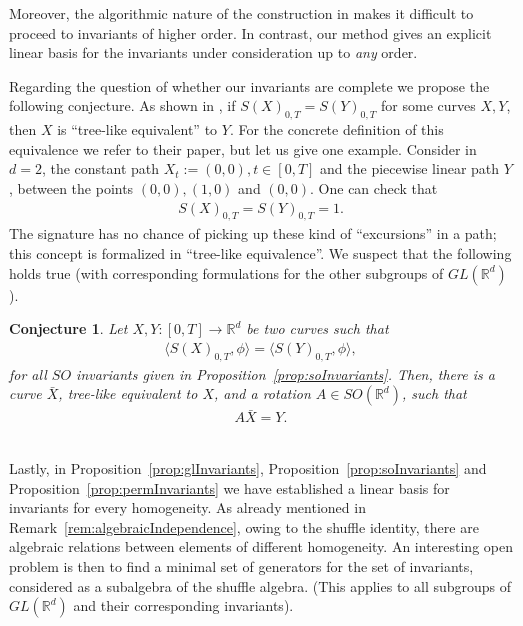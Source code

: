 \documentclass{scrartcl}
\theoremstyle{plain}
\newtheorem{conjecture}[theorem]{Conjecture}
\theoremstyle{definition}
\newcommand{\R}{\mathbb{R}}
\newcommand{\1}[1]{1_{\{#1\}}}
\newcommand{\ds}{d} %
\begin{document}
Moreover,
the algorithmic nature of the construction in \cite{bib:FKK2010}
makes it difficult to proceed to invariants of higher order.
In contrast, our method gives an explicit linear basis
for the invariants under consideration up to \emph{any} order.

Regarding the question of whether our invariants are complete we propose the following conjecture.
%
As shown in \cite{bib:HL2010}, if $S(X)_{0,T} = S(Y)_{0,T}$
for some curves $X,Y$, then $X$ is ``tree-like equivalent'' to $Y$.
For the concrete definition of this equivalence we refer to their paper,
but let us give one example.
%
Consider in $\ds=2$, the constant path $X_t := (0,0), t \in [0,T]$
and the piecewise linear path $Y$, between the points $(0,0),(1,0)$ and $(0,0)$.
One can check that
\begin{align*}
  S(X)_{0,T} = S(Y)_{0,T} = 1.
\end{align*}
The signature has no chance of picking up these kind of ``excursions'' in a path;
this concept is formalized in ``tree-like equivalence''.
%
We suspect that the following holds true
(with corresponding formulations for the other subgroups of $GL(\R^\ds)$).
\begin{conjecture}
  Let $X, Y: [0,T] \to \R^\ds$ be two curves such that
  \begin{align*}
    \Big\langle S(X)_{0,T}, \phi \Big\rangle = \Big\langle S(Y)_{0,T}, \phi \Big\rangle,
  \end{align*}
  for all $SO$ invariants given in Proposition~\ref{prop:soInvariants}.
  Then, there is a curve $\bar X$, tree-like equivalent to $X$,
  and a rotation $A \in SO(\R^d)$, such that
  \begin{align*}
    A \bar X = Y.
  \end{align*}
\end{conjecture}

~\\

Lastly, in Proposition~\ref{prop:glInvariants}, Proposition~\ref{prop:soInvariants} and Proposition~\ref{prop:permInvariants}
we have established a linear basis for invariants for every homogeneity.
%
As already mentioned in Remark~\ref{rem:algebraicIndependence},
owing to the shuffle identity,
there are algebraic relations between elements of different homogeneity.
%
An interesting open problem is then to find a minimal set of generators
for the set of invariants, considered as a subalgebra of the shuffle algebra.
(This applies to all subgroups of $GL(\R^\ds)$ and their corresponding invariants).
\end{document}
